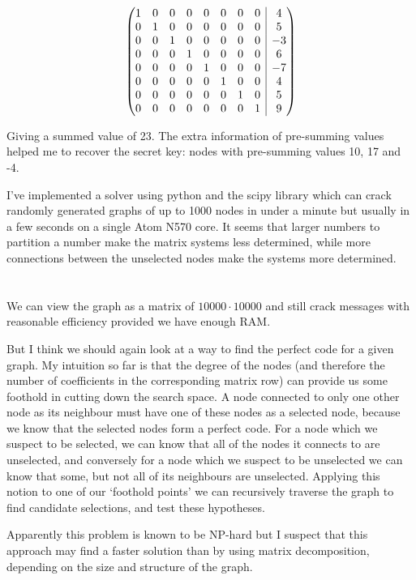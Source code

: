 \documentclass{article}
\makeatletter
\newenvironment{amatrix}[1]{%
  \left(\begin{array}{@{}*{#1}{c}|c@{}}
}{%
  \end{array}\right)
}
\makeatother
\begin{document}
\[
\begin{amatrix}{8}
1 & 0 & 0 & 0 & 0 & 0 & 0 & 0 &  4 \\
0 & 1 & 0 & 0 & 0 & 0 & 0 & 0 &  5 \\
0 & 0 & 1 & 0 & 0 & 0 & 0 & 0 & -3 \\
0 & 0 & 0 & 1 & 0 & 0 & 0 & 0 &  6 \\
0 & 0 & 0 & 0 & 1 & 0 & 0 & 0 & -7 \\
0 & 0 & 0 & 0 & 0 & 1 & 0 & 0 &  4 \\
0 & 0 & 0 & 0 & 0 & 0 & 1 & 0 &  5 \\
0 & 0 & 0 & 0 & 0 & 0 & 0 & 1 &  9
\end{amatrix}
\]

Giving a summed value of 23.
The extra information of pre-summing values helped me to recover the secret key: nodes with pre-summing values 10, 17 and -4.

I've implemented a solver using python and the scipy library which can crack randomly generated graphs of up to 1000 nodes in under a minute but usually in a few seconds on a single Atom N570 core.
It seems that larger numbers to partition a number make the matrix systems less determined, while more connections between the unselected nodes make the systems more determined.

\section{}
We can view the graph as a matrix of $10000 \cdot 10000$ and still crack messages with reasonable efficiency provided we have enough RAM.

But I think we should again look at a way to find the perfect code for a given graph.
My intuition so far is that the degree of the nodes (and therefore the number of coefficients in the corresponding matrix row) can provide us some foothold in cutting down the search space.
A node connected to only one other node as its neighbour must have one of these nodes as a selected node, because we know that the selected nodes form a perfect code.
For a node which we suspect to be selected, we can know that all of the nodes it connects to are unselected, and conversely for a node which we suspect to be unselected we can know that some, but not all of its neighbours are unselected.
Applying this notion to one of our `foothold points' we can recursively traverse the graph to find candidate selections, and test these hypotheses.

Apparently this problem is known to be NP-hard but I suspect that this approach may find a faster solution than by using matrix decomposition, depending on the size and structure of the graph.
\end{document}
